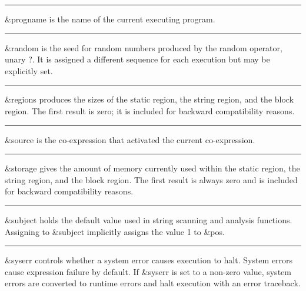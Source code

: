 \bigskip\hrule\vspace{0.1cm}

\noindent
{}\textsf{\&progname} is the name of the current
executing program.

\bigskip\hrule\vspace{0.1cm}

\noindent
{}\textsf{\&random} is the seed for random
numbers produced by the random operator, unary \textsf{?}. It is
assigned a different sequence for each execution but may be explicitly
set.

\bigskip\hrule\vspace{0.1cm}

\noindent
{}\textsf{\&regions} produces the sizes of the static
region, the string region, and the block region. The first result is
zero; it is included for backward compatibility reasons.

\bigskip\hrule\vspace{0.1cm}

\noindent
\textsf{\&source} is the co-expression that activated the current
co-expression.

\bigskip\hrule\vspace{0.1cm}

\noindent
{}\textsf{\&storage} gives the amount of memory
currently used within the static region, the string region, and the
block region. The first result is always zero and is included for
backward compatibility reasons.

\bigskip\hrule\vspace{0.1cm}

\noindent
{}\textsf{\&subject} holds the default
value used in string scanning and analysis functions. Assigning to
\textsf{\&subject} implicitly assigns the value \textsf{1} to
\textsf{\&pos}.

\bigskip\hrule\vspace{0.1cm}

\noindent
\textsf{\&syserr} controls whether a system error causes execution to
halt. System errors cause expression failure by
default. If \textsf{\&syserr} is set to a non-zero value, system errors
are converted to runtime errors and halt execution with an error
traceback.

